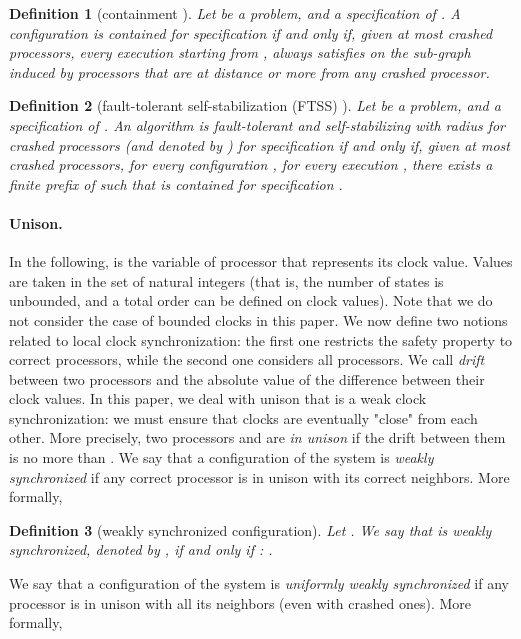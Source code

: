 \documentclass[11pt,english,letterpaper]{article}
\newtheorem{definition}{Definition}
\begin{document}
\begin{definition} [containment \cite{NA02c}]
Let  be a problem, and  a specification of . A configuration  is contained for specification  if and only if, given at most  crashed processors, every execution starting from , always satisfies  on the sub-graph induced by processors that are at distance  or more from any crashed processor.
\end{definition}

\begin{definition} [fault-tolerant self-stabilization (FTSS) \cite{AH93c,GP93c}] \label{def:ftss}
Let  be a problem,  and  a specification of . An algorithm  is fault-tolerant and self-stabilizing  with radius  for  crashed processors (and denoted by ) for specification  if and only if, given at most  crashed processors, for every configuration  , for every execution , there exists a finite prefix  of  such that  is contained for specification .
\end{definition}

\paragraph{Unison.} In the following,  is the variable of processor  that represents its clock value. Values are taken in the set of natural integers (that is, the number of states is unbounded, and a total order can be defined on clock values). Note that we do not consider the case of bounded clocks in this paper. We now define two notions related to local clock synchronization: the first one restricts the safety property to correct processors, while the second one considers all processors. We call \emph{drift} between two processors  and   the absolute value of the difference between their clock values. In this paper, we deal with unison that is a weak clock synchronization: we must ensure that clocks are eventually "close" from each other. More precisely, two processors  and  are \emph{in unison} if the drift between them is no more than . We say that a configuration of the system is \emph{weakly synchronized} if any correct processor is in unison with its correct neighbors. More formally, 

\begin{definition}[weakly synchronized configuration]
Let . We say that  is weakly synchronized, denoted by , if and only if :	.
\end{definition}
	
We say that a configuration of the system is \emph{uniformly weakly synchronized} if any processor is in unison with all its neighbors (even with crashed ones). More formally,
 
\end{document}
